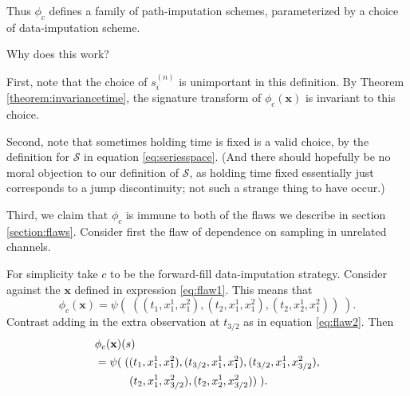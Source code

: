 \documentclass{article}
\newcommand{\seriesspace}{\mathcal{S}}
\begin{document}
Thus $\phi_c$ defines a family of path-imputation schemes, parameterized by a choice of data-imputation scheme.

Why does this work?

First, note that the choice of $s_i^{(n)}$ is unimportant in this definition. By Theorem \ref{theorem:invariancetime}, the signature transform of $\phi_c(\mathbf{x})$ is invariant to this choice.

Second, note that sometimes holding time is fixed is a valid choice, by the definition for $\seriesspace$ in equation \eqref{eq:seriesspace}. (And there should hopefully be no moral objection to our definition of $\seriesspace$, as holding time fixed essentially just corresponds to a jump discontinuity; not such a strange thing to have occur.)

Third, we claim that $\phi_c$ is immune to both of the flaws we describe in section \ref{section:flaws}. Consider first the flaw of dependence on sampling in unrelated channels.

For simplicity take $c$ to be the forward-fill data-imputation strategy. Consider against the $\mathbf{x}$ defined in expression \eqref{eq:flaw1}. This means that
\begin{equation}\label{eq:causal1}
    \phi_c(\mathbf{x}) = \psi(\;((t_1, x_1^1, x_1^2), (t_2, x_1^1, x_1^2), (t_2, x_2^1, x_1^2))\;).
\end{equation}
Contrast adding in the extra observation at $t_{3/2}$ as in equation \eqref{eq:flaw2}. Then
\begin{align}
    &\phi_c(\mathbf{x})(s)\nonumber\\
    &=\psi(\;((t_1, x_1^1, x_1^2), (t_{3/2}, x_1^1, x_1^2), (t_{3/2}, x_1^1, x_{3/2}^2),\nonumber\\ &\hspace{3.1em}(t_2, x_1^1, x_{3/2}^2), (t_2, x_2^1, x_{3/2}^2))\;).\label{eq:causal2}
\end{align}
\end{document}
